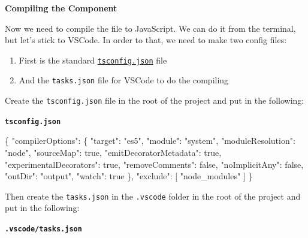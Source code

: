 \documentclass[12pt,]{article}
\newenvironment{Shaded}{}{}
\newcommand{\KeywordTok}[1]{\textcolor[rgb]{0.00,0.00,1.00}{{#1}}}
\newcommand{\DataTypeTok}[1]{{#1}}
\newcommand{\StringTok}[1]{\textcolor[rgb]{0.00,0.50,0.50}{{#1}}}
\newcommand{\OtherTok}[1]{\textcolor[rgb]{1.00,0.25,0.00}{{#1}}}
\newcommand{\FunctionTok}[1]{{#1}}
\begin{document}
\textbf{Compiling the Component}

Now we need to compile the file to JavaScript. We can do it from the
terminal, but let's stick to VSCode. In order to that, we need to make
two config files:

\begin{enumerate}
\def\labelenumi{\arabic{enumi}.}
\item
  First is the standard
  \href{http://json.schemastore.org/tsconfig}{\texttt{tsconfig.json}}
  file
\item
  And the \texttt{tasks.json} file for VSCode to do the compiling
\end{enumerate}

Create the \texttt{tsconfig.json} file in the root of the project and
put in the following:

\textbf{\texttt{tsconfig.json}}

\begin{Shaded}
\begin{Highlighting}[numbers=left,,]
\FunctionTok{\{}
  \DataTypeTok{"compilerOptions"}\FunctionTok{:} \FunctionTok{\{}
    \DataTypeTok{"target"}\FunctionTok{:} \StringTok{"es5"}\FunctionTok{,}
    \DataTypeTok{"module"}\FunctionTok{:} \StringTok{"system"}\FunctionTok{,}
    \DataTypeTok{"moduleResolution"}\FunctionTok{:} \StringTok{"node"}\FunctionTok{,}
    \DataTypeTok{"sourceMap"}\FunctionTok{:} \KeywordTok{true}\FunctionTok{,}
    \DataTypeTok{"emitDecoratorMetadata"}\FunctionTok{:} \KeywordTok{true}\FunctionTok{,}
    \DataTypeTok{"experimentalDecorators"}\FunctionTok{:} \KeywordTok{true}\FunctionTok{,}
    \DataTypeTok{"removeComments"}\FunctionTok{:} \KeywordTok{false}\FunctionTok{,}
    \DataTypeTok{"noImplicitAny"}\FunctionTok{:} \KeywordTok{false}\FunctionTok{,}
    \DataTypeTok{"outDir"}\FunctionTok{:} \StringTok{"output"}\FunctionTok{,}
    \DataTypeTok{"watch"}\FunctionTok{:} \KeywordTok{true}
  \FunctionTok{\},}
  \DataTypeTok{"exclude"}\FunctionTok{:} \OtherTok{[}
    \StringTok{"node_modules"}
  \OtherTok{]}
\FunctionTok{\}}
\end{Highlighting}
\end{Shaded}

Then create the \texttt{tasks.json} in the \texttt{.vscode} folder in
the root of the project and put in the following:

\textbf{\texttt{.vscode/tasks.json}}

\begin{Shaded}
\end{Shaded}
\end{document}

